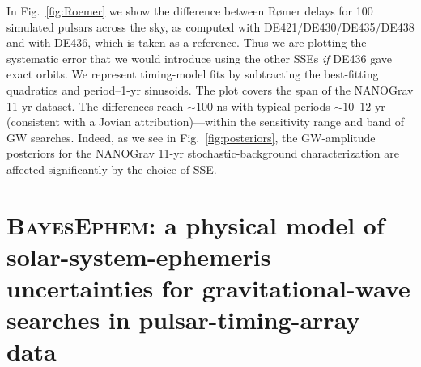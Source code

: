 \documentclass[iop,apj,twocolappendix]{emulateapj}
\begin{document}
In Fig.\ \ref{fig:Roemer} we show the difference between R{\o}mer delays for 100 simulated pulsars across the sky, as computed with DE421/DE430/DE435/DE438 and with DE436, which is taken as a reference. Thus we are plotting the systematic error that we would introduce using the other SSEs \emph{if} DE436 gave exact orbits. We represent timing-model fits by subtracting the best-fitting quadratics and period--1-yr sinusoids. The plot covers the span of the NANOGrav 11-yr dataset.
The differences reach $\sim 100$ ns with typical periods $\sim 10$--$12$ yr (consistent with a Jovian attribution)---within the sensitivity range and band of GW searches. Indeed, as we see in Fig.\ \ref{fig:posteriors}, the GW-amplitude posteriors for the NANOGrav 11-yr stochastic-background characterization are affected significantly by the choice of SSE.

\section{\textsc{BayesEphem}: a physical model of solar-system-ephemeris uncertainties for gravitational-wave searches in pulsar-timing-array data}
\label{sec:physical}
\end{document}
